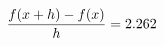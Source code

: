 \documentclass[preview]{standalone}
\begin{document}
\begin{align*}
\special{dvisvgm:raw <g id='unique000'>}\frac{f(x+h)-f(x)}{h} = 2.262\special{dvisvgm:raw </g>}
\end{align*}
\end{document}
